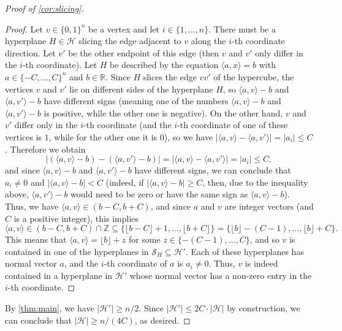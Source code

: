 \documentclass[10pt,a4paper]{amsart}
\newcommand{\R}{\mathbb R}
\newcommand{\ang}[1]{\langle#1\rangle}
\newcommand{\bin}{\{0,1\}}
\newcommand{\cH}{\mathcal H}
\newcommand{\cS}{\mathcal S}
\newcommand{\floor}[1]{\lfloor#1\rfloor}
\renewcommand{\ge}{\geqslant}
\renewcommand{\le}{\leqslant}
\begin{document}
\begin{proof}[Proof of \cref{cor:slicing}]
\begin{proof}
    Let $v\in \bin^n$ be a vertex and let $i\in \{1,\dots,n\}$. There must be a hyperplane $H\in \cH$ slicing the edge adjacent to $v$ along the $i$-th coordinate direction. Let $v'$ be the other endpoint of this edge (then $v$ and $v'$ only differ in the $i$-th coordinate). Let $H$ be described by the equation $\ang{a,x} = b$  with $a\in \{-C,\dots, C\}^n$ and $b\in \R$. Since $H$ slices the edge $vv'$ of the hypercube, the vertices $v$ and $v'$ lie on different sides of the hyperplane $H$, so $\ang{a,v} - b$ and $\ang{a,v'} - b$ have different signs (meaning one of the numbers $\ang{a,v} - b$ and $\ang{a,v'} - b$ is positive, while the other one is negative). 
    On the other hand, $v$ and $v'$ differ only in the $i$-th coordinate (and the $i$-th coordinate of one of these vertices is $1$, while for the other one it is $0$), so we have $|\ang{a,v}-\ang{a,v'}|=|a_i|\le C$. Therefore we obtain
    \[|(\ang{a,v} - b) - (\ang{a,v'} - b)| = |\ang{a,v}-\ang{a,v'}| =|a_i| \le C,\]
    and since $\ang{a,v} - b$ and $\ang{a,v'} - b$ have different signs, we can conclude that $a_i\ne 0$ and $|\ang{a,v} - b|<C$ (indeed, if $|\ang{a,v} - b|\ge C$, then, due to the inequality above,  $\ang{a,v'} - b$ would need to be zero or have the same sign as $\ang{a,v} - b$). Thus, we have $\ang{a,v}\in (b-C,b+C)$, and since $a$ and $v$ are integer vectors (and $C$ is a positive integer), this implies
    \[\ang{a,v}\in (b-C,b+C)\cap \mathbb{Z}\subseteq \{\floor{b-C}+1,\dots, \floor{b+C}\}=\{\floor{b}-(C-1),\dots, \floor{b}+C\}.\]
    This means that $\ang{a,v}=\floor{b}+z$ for some $z\in \{-(C-1),\dots, C\}$, and so $v$ is contained in one of the hyperplanes in $\cS_H\subseteq \cH'$. Each of these hyperplanes has normal vector $a$, and the $i$-th coordinate of $a$ is $a_i\ne 0$. Thus, $v$ is indeed contained in a hyperplane in $\cH'$ whose normal vector has a non-zero entry in the $i$-th coordinate.
\end{proof}  



By \cref{thm:main}, we have $|\cH'| \ge n/2$. Since $|\cH'|\le 2C\cdot |\cH|$ by construction, we can conclude that $|\cH|\ge n/(4C)$, as desired.
\end{proof}
\end{document}

